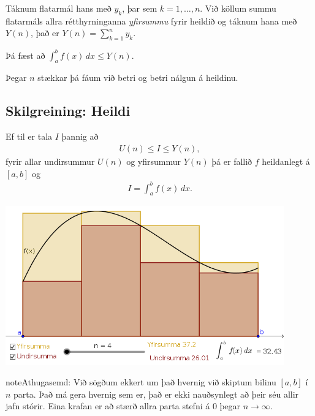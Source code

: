 \documentclass[a4paper,10pt,icelandic]{sphinxmanual}
\begin{document}

Táknum flatarmál hans með \(y_k\), þar sem \(k=1,\ldots,n\). Við
köllum summu flatarmáls allra rétthyrninganna \textit{yfirsummu} fyrir heildið
og táknum hana með \(Y(n)\), það er \(Y(n) = \sum_{k=1}^n y_k\).

Þá fæst að \(\int_a^b f(x)\, dx \leq Y(n)\).

Þegar \(n\) stækkar þá fáum við betri og betri nálgun á heildinu.


\subsection{Skilgreining: Heildi}
\label{\detokenize{kafli06:skilgreining-heildi}}
Ef til er  tala \(I\) þannig að
\begin{equation*}
\begin{split}U(n) \leq I \leq Y(n),\end{split}
\end{equation*}
fyrir allar undirsummur \(U(n)\) og yfirsummur \(Y(n)\) þá er
fallið \(f\) heildanlegt á \([a,b]\) og
\begin{equation*}
\begin{split}I = \int_a^b f(x)\, dx.\end{split}
\end{equation*}

\begin{center}
\includegraphics[width=12cm,keepaspectratio=true]{./03_undirogyfirsumma.png}
\end{center}


\begin{sphinxadmonition}{note}{Athugasemd:}
Við sögðum ekkert um það hvernig við skiptum bilinu \([a,b]\) í
\(n\) parta. Það má gera hvernig sem er, það er ekki nauðsynlegt að
þeir séu allir jafn stórir. Eina krafan er að stærð allra parta stefni á
0 þegar \(n\to \infty\).
\end{sphinxadmonition}
\end{document}
